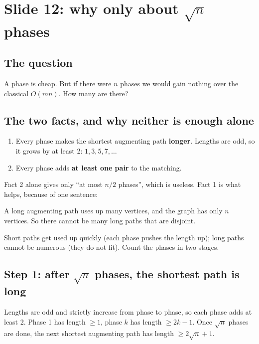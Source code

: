 \documentclass[11pt,a4paper]{article}
\begin{document}
\section{Slide 12: why only about $\sqrt n$ phases}
\subsection*{The question}
A phase is cheap. But if there were $n$ phases we would gain nothing over the classical $O(mn)$. How many are there?

\subsection*{The two facts, and why neither is enough alone}
\begin{enumerate}
  \item Every phase makes the shortest augmenting path \textbf{longer}. Lengths are odd, so it grows by at least 2: $1,3,5,7,\dots$
  \item Every phase adds \textbf{at least one pair} to the matching.
\end{enumerate}
Fact 2 alone gives only ``at most $n/2$ phases'', which is useless. Fact 1 is what helps, because of one sentence:

\begin{key}A long augmenting path uses up many vertices, and the graph has only $n$ vertices. So there cannot be many long paths that are disjoint.\end{key}
Short paths get used up quickly (each phase pushes the length up); long paths cannot be numerous (they do not fit). Count the phases in two stages.

\subsection*{Step 1: after $\sqrt n$ phases, the shortest path is long}
Lengths are odd and strictly increase from phase to phase, so each phase adds at least 2. Phase 1 has length $\ge1$, phase $k$ has length $\ge2k-1$. Once $\sqrt n$ phases are done, the next shortest augmenting path has length $\ge2\sqrt n+1$.
\end{document}
